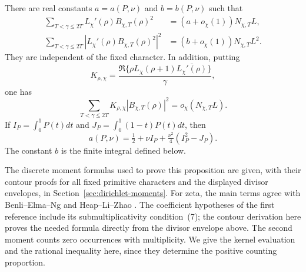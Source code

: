 \begin{proposition}\label{prop:square-moments}
There are real constants $a=a(P,\nu)$ and $b=b(P,\nu)$ such that
\begin{align}
 \sum_{T<\gamma\le2T}L_\chi'(\rho)B_{\chi,T}(\rho)^2
       &=(a+o_\chi(1))N_{\chi,T}L,\label{eq:square-first}\\
 \sum_{T<\gamma\le2T}|L_\chi'(\rho)B_{\chi,T}(\rho)^2|^2
       &=(b+o_\chi(1))N_{\chi,T}L^2.\label{eq:square-second}
\end{align}
They are independent of the fixed character. In addition, putting
\[
 K_{\rho,\chi}=\frac{\Re\{\rho L_\chi(\rho+1)
                  \overline{L_\chi'(\rho)}\}}{\gamma},
\]
one has
\begin{equation}\label{eq:square-cancel}
 \sum_{T<\gamma\le2T}K_{\rho,\chi}|B_{\chi,T}(\rho)|^2
       =o_\chi(N_{\chi,T}L).
\end{equation}
If $I_P=\int_0^1P(t)dt$ and $J_P=\int_0^1(1-t)P(t)dt$, then
\[
 a(P,\nu)=\tfrac12+\nu I_P+\tfrac{\nu^2}{4}(I_P^2-J_P).
\]
The constant $b$ is the finite integral defined below.
\end{proposition}

The discrete moment formulas used to prove this proposition are given,
with their contour proofs for all fixed primitive characters and the
displayed divisor envelopes, in Section~\ref{sec:dirichlet-moments}.
For zeta, the main terms agree with Benli--Elma--Ng
\cite[Theorem~1.1, equations~(9)--(14), pp.~3--4]{benli-elma-ng}
and Heap--Li--Zhao \cite[Theorem~2, equations~(5)--(9), pp.~3--5]{heap-li-zhao}.
The coefficient hypotheses of the first reference include its
submultiplicativity condition~(7); the contour derivation here proves
the needed formula directly from the divisor envelope above.
The second moment counts zero occurrences with multiplicity.
We give the kernel evaluation and
the rational inequality here, since they determine the positive counting
proportion.


